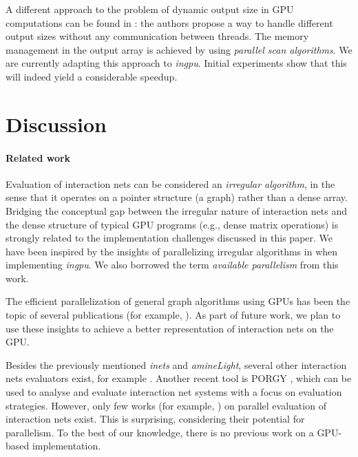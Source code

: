 \documentclass[submission,copyright,creativecommons]{eptcs}
\begin{document}
A different approach to the problem of dynamic output size in GPU computations
can be found in \cite{DBLP:journals/cg/LippWW10}: the authors propose a way to
handle different output sizes without any communication between threads. The
memory management in the output array is achieved by using \emph{parallel scan
algorithms}. We are currently adapting this approach to \emph{ingpu}. Initial
experiments show that this will indeed yield a considerable speedup.



\section{Discussion}
\label{sec:discussion}

\paragraph{\textbf{Related work}}
Evaluation of interaction nets can be considered an \emph{irregular algorithm},
in the sense that it operates on a pointer structure (a graph) rather than a
dense array. Bridging the conceptual gap between the irregular nature of
interaction nets and the dense structure of typical GPU programs (e.g., dense
matrix operations) is strongly related to the implementation challenges
discussed in this paper. We have been inspired by the insights
of parallelizing irregular algorithms in \cite{DBLP:conf/ppopp/Mendez-LojoNPSHKBP10} when
implementing \emph{ingpu}. We also borrowed the term \emph{available
parallelism} from this work.

The efficient parallelization of general graph algorithms using GPUs has been
the topic of several publications (for example,
\cite{DBLP:conf/ppopp/HongKOO11}). As part of future work, we plan to use these
insights to achieve a better representation of interaction nets on the GPU.

Besides the previously mentioned \emph{inets} and \emph{amineLight},
several other interaction nets evaluators exist, for example
\cite{jose_bacelar_almeida_tool_2008,DBLP:conf/rta/Lippi02}. Another recent tool is PORGY
\cite{DBLP:journals/corr/abs-1102-2654}, which can be used to analyse and
evaluate interaction net systems with a focus on evaluation strategies.
However, only few works (for example, \cite{DBLP:conf/rta/Pinto01}) on parallel
evaluation of interaction nets exist. This is surprising, considering their
potential for parallelism. To the best of our knowledge, there is no previous
work on a GPU-based implementation.
\end{document}
